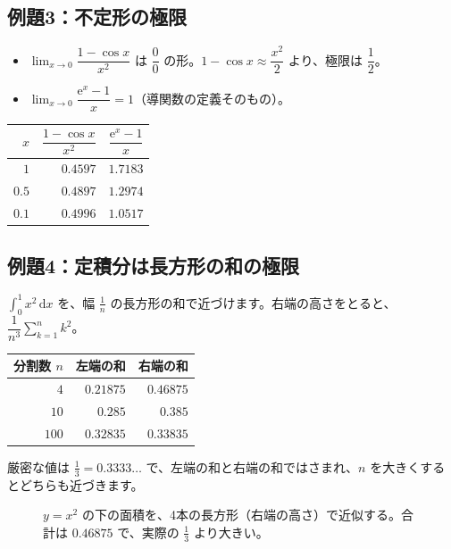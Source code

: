 \documentclass[a4paper,11pt,openany]{ltjsbook}
\newcommand{\dd}{\mathrm{d}}
\newcommand{\ee}{\mathrm{e}}
\begin{document}
\subsection*{例題3：不定形の極限}

\begin{itemize}[leftmargin=1.5em]
\item $\displaystyle\lim_{x\to0}\dfrac{1-\cos x}{x^2}$ は $\dfrac00$ の形。$1-\cos x\approx\dfrac{x^2}{2}$ より、極限は $\dfrac12$。
\item $\displaystyle\lim_{x\to0}\dfrac{\ee^x-1}{x}=1$（導関数の定義そのもの）。
\end{itemize}

\begin{center}
\begin{tabular}{rrr}
\toprule
$x$ & $\dfrac{1-\cos x}{x^2}$ & $\dfrac{\ee^x-1}{x}$\\
\midrule
$1$ & $0.4597$ & $1.7183$\\
$0.5$ & $0.4897$ & $1.2974$\\
$0.1$ & $0.4996$ & $1.0517$\\
\bottomrule
\end{tabular}
\end{center}

\subsection*{例題4：定積分は長方形の和の極限}

$\displaystyle\int_0^1x^2\,\dd x$ を、幅 $\frac1n$ の長方形の和で近づけます。右端の高さをとると、$\dfrac1{n^3}\sum_{k=1}^{n}k^2$。

\begin{center}
\begin{tabular}{rrr}
\toprule
分割数 $n$ & 左端の和 & 右端の和\\
\midrule
$4$ & $0.21875$ & $0.46875$\\
$10$ & $0.285$ & $0.385$\\
$100$ & $0.32835$ & $0.33835$\\
\bottomrule
\end{tabular}
\end{center}

厳密な値は $\frac13=0.3333\ldots$ で、左端の和と右端の和ではさまれ、$n$ を大きくするとどちらも近づきます。

\begin{figure}[htbp]
\centering
{}
\caption{$y=x^2$ の下の面積を、4本の長方形（右端の高さ）で近似する。合計は $0.46875$ で、実際の $\frac13$ より大きい。}
\end{figure}
\end{document}
